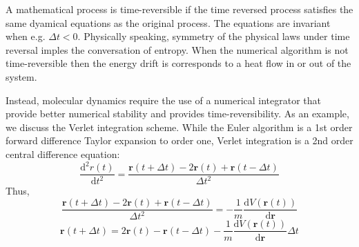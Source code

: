 A mathematical process is time-reversible if the time reversed process satisfies the same dyamical equations as the original process.  The equations are invariant when e.g. $\Delta t < 0$.  Physically speaking, symmetry of the physical laws under time reversal imples the conversation of entropy.  When the numerical algorithm is not time-reversible then the energy drift is corresponds to a heat flow in or out of the system.


Instead, molecular dynamics require the use of a numerical integrator that provide better numerical stability and provides time-reversibility.  As an example, we discuss the Verlet integration scheme\cite{verlet1967_integrator}.  While the Euler algorithm is a 1st order forward difference Taylor expansion to order one,  Verlet integration is a 2nd order central difference equation:
\begin{equation}
	\frac{\mathrm{d}^2 r(t)}
	     {\mathrm{d}t^2}
	= \frac{\bm{r}(t+\Delta t)
	          - 2\bm{r}(t)
		        + \bm{r}(t-\Delta t)}
	       {\Delta t^2}
\end{equation}
Thus,
\begin{equation}
  \frac{\bm{r}(t+\Delta t)
	      - 2\bm{r}(t)
				+ \bm{r}(t-\Delta t)}
	     {\Delta t^2}
	=
	- \frac{1}
	       {m}
		\frac{\mathrm{d} V(\bm{r}(t))}
		     {\mathrm{d} \bm{r}}
\end{equation}
\begin{equation}
	\bm{r}(t+\Delta t)
	=
	2\bm{r}(t)
	- \bm{r}(t-\Delta t)
	- \frac{1}{m}
		\frac{\mathrm{d} V(\bm{r}(t))}
		     {\mathrm{d} \bm{r}}
		\Delta t
\end{equation}

